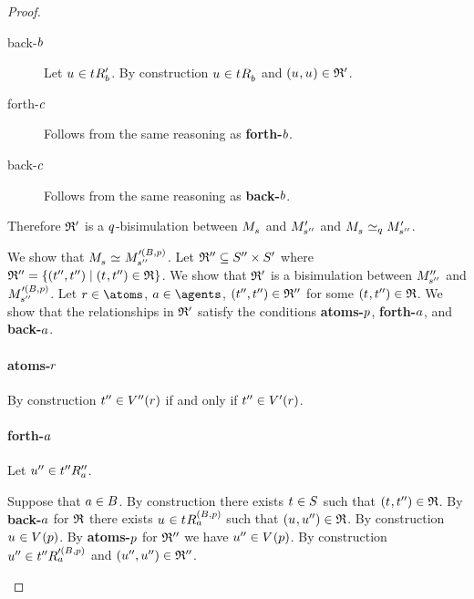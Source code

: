 \begin{proof}
\begin{description}
\begin{description}
\begin{description}
                    \item[back-$\agentB$]
                        Let $\kStateU \in \kSuccessorsPB{\kStateT}$.
                        By construction $\kStateU \in \kSuccessorsB{\kStateT}$ and $(\kStateU, \kStateU) \in \bisimulation'$.
                    \item[forth-$\agentC$]
                        Follows from the same reasoning as {\bf forth-$\agentB$}.
                    \item[back-$\agentC$]
                        Follows from the same reasoning as {\bf back-$\agentB$}.
                \end{description}
        \end{description}

        Therefore $\bisimulation'$ is a $\atomQ$-bisimulation between $\kPModel{\kStateS}$ and $\kPModelP{\kStateSPP}$ and $\kPModel{\kStateS} \bisimilar[\atomQ] \kPModelP{\kStateSPP}$.

        We show that $\kPModel{\kStateS} \bisimilar \kPModel[\prime(\agentsB, \atomP)]{\kStateSPP}$.
        Let $\bisimulation'' \subseteq \kStatesPP \times \kStatesP$ where $\bisimulation'' = \{(\kStateTPP, \kStateTPP) \mid (\kStateT, \kStateTPP) \in \bisimulation\}$.
        We show that $\bisimulation'$ is a bisimulation between $\kPModelPP{\kStateSPP}$ and $\kPModel[\prime(\agentsB, \atomP)]{\kStateSPP}$.
        Let $\atomR \in \atoms$, $\agentA \in \agents$, $(\kStateTPP, \kStateTPP) \in \bisimulation''$ for some $(\kStateT, \kStateTPP) \in \bisimulation$.
        We show that the relationships in $\bisimulation'$ satisfy the conditions {\bf atoms-$\atomP$}, {\bf forth-$\agentA$}, and {\bf back-$\agentA$}.

        \paragraph{atoms-$\atomR$}
        By construction $\kStateTPP \in \kValuationPP(\atomR)$ if and only if $\kStateTPP \in \kValuationP(\atomR)$.

        \paragraph{forth-$\agentA$}
        Let $\kStateUPP \in \kSuccessorsPPA{\kStateTPP}$.

        Suppose that $\agentA \in \agentsB$.
        By construction there exists $\kStateT \in \kStates$ such that $(\kStateT, \kStateTPP) \in \bisimulation$.
        By {\bf back-$\agentA$} for $\bisimulation$ there exists $\kStateU \in \kSuccessorsA[(\agentsB, \atomP)]{\kStateT}$ such that $(\kStateU, \kStateUPP) \in \bisimulation$.
        By construction $\kStateU \in \kValuation(\atomP)$.
        By {\bf atoms-$\atomP$} for $\bisimulation''$ we have $\kStateUPP \in \kValuation(\atomP)$.
        By construction $\kStateUPP \in \kSuccessorsA[\prime(\agentsB, \atomP)]{\kStateTPP}$ and $(\kStateUPP, \kStateUPP) \in \bisimulation''$.


\end{description}
\end{proof}
